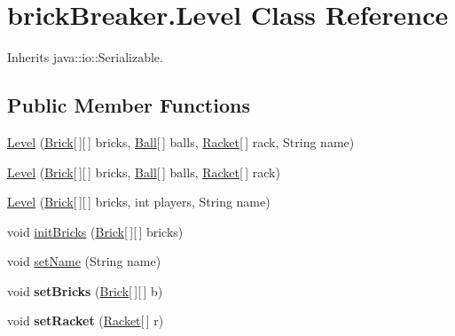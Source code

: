 \hypertarget{classbrick_breaker_1_1_level}{
\section{brickBreaker.Level Class Reference}
\label{classbrick_breaker_1_1_level}
}


Inherits java::io::Serializable.

\subsection*{Public Member Functions}
\begin{DoxyCompactItemize}
\item 
\hyperlink{classbrick_breaker_1_1_level_ac98f98fe72c9000911b79fabd548e44e}{Level} (\hyperlink{classbrick_breaker_1_1_brick}{Brick}\mbox{[}$\,$\mbox{]}\mbox{[}$\,$\mbox{]} bricks, \hyperlink{classbrick_breaker_1_1_ball}{Ball}\mbox{[}$\,$\mbox{]} balls, \hyperlink{classbrick_breaker_1_1_racket}{Racket}\mbox{[}$\,$\mbox{]} rack, String name)
\item 
\hyperlink{classbrick_breaker_1_1_level_aa88640ad04ca2a8b471be22a39bd2f75}{Level} (\hyperlink{classbrick_breaker_1_1_brick}{Brick}\mbox{[}$\,$\mbox{]}\mbox{[}$\,$\mbox{]} bricks, \hyperlink{classbrick_breaker_1_1_ball}{Ball}\mbox{[}$\,$\mbox{]} balls, \hyperlink{classbrick_breaker_1_1_racket}{Racket}\mbox{[}$\,$\mbox{]} rack)
\item 
\hyperlink{classbrick_breaker_1_1_level_ab814f5c562c5703aedf3569501b44845}{Level} (\hyperlink{classbrick_breaker_1_1_brick}{Brick}\mbox{[}$\,$\mbox{]}\mbox{[}$\,$\mbox{]} bricks, int players, String name)
\item 
void \hyperlink{classbrick_breaker_1_1_level_a2cf993a57ad58665d34d09b9366a39b4}{initBricks} (\hyperlink{classbrick_breaker_1_1_brick}{Brick}\mbox{[}$\,$\mbox{]}\mbox{[}$\,$\mbox{]} bricks)
\item 
void \hyperlink{classbrick_breaker_1_1_level_a9658a9bfa4707f92de4891f913377202}{setName} (String name)
\item 
\hypertarget{classbrick_breaker_1_1_level_a236ad90c2a8f2193dd154e5b3b424371}{
void {\bfseries setBricks} (\hyperlink{classbrick_breaker_1_1_brick}{Brick}\mbox{[}$\,$\mbox{]}\mbox{[}$\,$\mbox{]} b)}
\label{classbrick_breaker_1_1_level_a236ad90c2a8f2193dd154e5b3b424371}

\item 
\hypertarget{classbrick_breaker_1_1_level_ac52e444e4bbbee478dbf4450932eda60}{
void {\bfseries setRacket} (\hyperlink{classbrick_breaker_1_1_racket}{Racket}\mbox{[}$\,$\mbox{]} r)}
\label{classbrick_breaker_1_1_level_ac52e444e4bbbee478dbf4450932eda60}


\end{DoxyCompactItemize}
